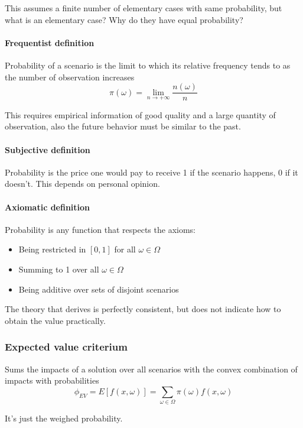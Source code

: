 This assumes a finite number of elementary cases with same probability, but what is an elementary case? Why do they have equal probability?

\paragraph{Frequentist definition} Probability of a scenario is the limit to which its relative frequency tends to as the number of observation increases
$$ \pi (\omega) = \lim_{n \rightarrow + \infty} \frac{n (\omega)}{n} $$

This requires empirical information of good quality and a large quantity of observation, also the future behavior must be similar to the past.

\paragraph{Subjective definition} Probability is the price one would pay to receive 1 if the scenario happens, 0 if it doesn't. This depends on personal opinion.

\paragraph{Axiomatic definition} Probability is any function that respects the axioms: 
\begin{itemize}
	\item Being restricted in $[0,1]$ for all $\omega \in \Omega$
	
	\item Summing to 1 over all $\omega \in \Omega$
	
	\item Being additive over sets of disjoint scenarios 
\end{itemize}

The theory that derives is perfectly consistent, but does not indicate how to obtain the value practically.

\subsubsection{Expected value criterium}

Sums the impacts of a solution over all scenarios with the convex combination of impacts with probabilities
$$ \phi_{EV} = E \left[f(x, \omega)\right] = \sum_{\omega \in \Omega} \pi (\omega) f (x, \omega) $$

It's just the weighed probability.

